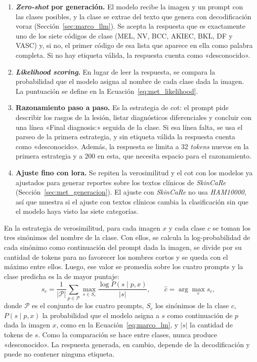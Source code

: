 \begin{enumerate}[leftmargin=1.6em]
  \item \textbf{\emph{Zero-shot} por generación.} El modelo recibe la imagen y un prompt con las clases posibles, y la
  clase se extrae del texto que genera con decodificación voraz (Sección~\ref{sec:marco_llm}). Se acepta la respuesta
  que es exactamente uno de los siete códigos de clase (MEL, NV, BCC, AKIEC, BKL, DF y VASC) y, si no, el primer código
  de esa lista que aparece en ella como palabra completa. Si no hay etiqueta válida, la respuesta cuenta
  como «desconocido».
  \item \textbf{\emph{Likelihood scoring}.} En lugar de leer la respuesta, se compara la probabilidad que el modelo asigna al
  nombre de cada clase dada la imagen. La puntuación se define en la Ecuación~\ref{eq:met_likelihood}.
  \item \textbf{Razonamiento paso a paso.} Es la estrategia de \gls{cot}: el prompt pide describir los rasgos de la
  lesión, listar diagnósticos diferenciales y concluir con una línea «Final diagnosis:» seguida de la clase. Si esa línea
  falta, se usa el parseo de la primera estrategia, y sin etiqueta válida la respuesta cuenta como «desconocido».
  Además, la respuesta se limita a 32 \emph{tokens} nuevos en la primera estrategia y a 200 en esta, que necesita espacio para el
  razonamiento.
  \item \textbf{Ajuste fino con \gls{lora}.} Se repiten la verosimilitud y el \gls{cot} con los modelos ya ajustados
  para generar reportes sobre los textos clínicos de \emph{SkinCaRe}~\cite{shen2025skincare}
  (Sección~\ref{sec:met_generacion}). El ajuste con \emph{SkinCaRe} no usa \emph{HAM10000}, así que muestra si el ajuste con textos
  clínicos cambia la clasificación sin que el modelo haya visto las siete categorías.
\end{enumerate}



En la estrategia de verosimilitud, para cada imagen $x$ y cada clase $c$ se toman los tres sinónimos del nombre de la
clase. Con ellos, se calcula la log-probabilidad de cada sinónimo como continuación del prompt dada la imagen, se
divide por su cantidad de tokens para no favorecer los nombres cortos y se queda con el máximo entre ellos. Luego, ese
valor se promedia sobre los cuatro prompts y la clase predicha es la de mayor puntaje:
\begin{equation}
    s_c = \frac{1}{|\mathcal{P}|} \sum_{p \in \mathcal{P}} \max_{s \in S_c} \frac{\log P(s \mid p, x)}{|s|},
    \qquad \hat{c} = \arg\max_{c} s_c,
    \label{eq:met_likelihood}
\end{equation}
donde $\mathcal{P}$ es el conjunto de los cuatro prompts, $S_c$ los sinónimos de la clase $c$, $P(s \mid p, x)$ la
probabilidad que el modelo asigna a $s$ como continuación de $p$ dada la imagen $x$, como en la
Ecuación~\ref{eq:marco_lm}, y $|s|$ la cantidad de tokens de $s$. Como la comparación se hace entre clases, nunca produce
«desconocido». La respuesta generada, en cambio, depende de la decodificación y puede no contener ninguna etiqueta.


